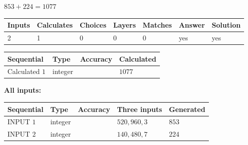 \documentclass{ctexart}
\begin{document}
 

$ %
853 +  %
224=   %
1077$
 
 
\noindent{}
 
 

 
   
   
   
   
\noindent\begin{tabular}{|l|l|l|l|l|l|l|}
 \hline
Inputs & Calculates & Choices & Layers & Matches & Answer & Solution \\ \hline
 2  & 
 1  & 
 0
  & 
 0  & 
 0  & 
  yes & 
  yes 
  \\ \hline
 \end{tabular}
   
   
   
   
\noindent{}
   
   
  
  
\noindent\begin{tabular}{|l|l|l|l|}
\hline
 Sequential & Type & Accuracy & Calculated \\ 
\hline
 
 
  Calculated $  1 $ & integer &  & 
  $ 1077 $ 
 \\  \hline  
 \end{tabular}
   
   
   
   
\noindent\vspace{0.1in}\hspace{-0.08in} {\textbf{\Large{All inputs: }}}
   
   
  
  
\noindent\begin{tabular}{|l|l|l|l|l|}
\hline
 Sequential & Type & Accuracy & Three inputs & Generated \\ 
\hline
 
 
  INPUT $  1 $ & integer &  & $
 520
 , 
 960
 , 
 3
 $ & $ 853 $ 
 \\  \hline  
 
 
  INPUT $  2 $ & integer &  & $
 140
 , 
 480
 , 
 7
 $ & $ 224 $ 
 \\  \hline  
 \end{tabular}
   
   
   
   
   
   
 \vspace{0.2in}
 
\end{document}
